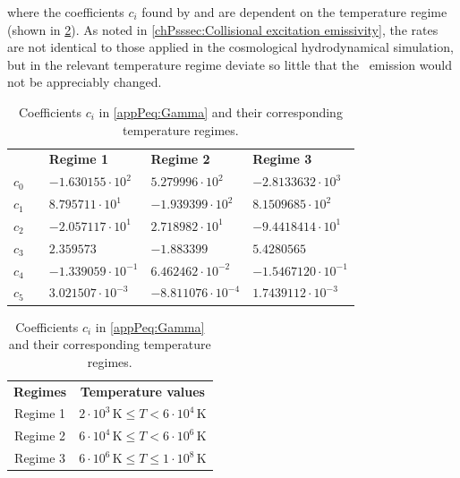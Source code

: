 \noindent where the coefficients $c_i$ found by \citet{1990MNRAS.242..692S} and \citet{1991ApJ...380..302S} are dependent on the temperature regime (shown in \cref{appPtab:Coefficients}). As noted in \cref{chPsssec:Collisional excitation emissivity}, the rates are not identical to those applied in the cosmological hydrodynamical simulation, but in the relevant temperature regime deviate so little that the \lya\ emission would not be appreciably changed.
\begin{table}
    \centering
    \caption[Coefficients $c_i$ in \cref{appPeq:Gamma}]{
        Coefficients $c_i$ in \cref{appPeq:Gamma} and their corresponding temperature regimes.
    }
    \begin{tabular}{c c l l l}
        
        & & \textbf{Regime 1}   & \textbf{Regime 2}     & \textbf{Regime 3} \\
        
        $c_0$ & & $-1.630155 \cdot 10^{2}$      & $5.279996 \cdot 10^{2}$ & $-2.8133632 \cdot 10^{3}$ \\
        
        $c_1$ & & $8.795711 \cdot 10^{1}$       & $-1.939399 \cdot 10^{2}$ & $8.1509685 \cdot 10^{2}$ \\
        
        $c_2$ & & $-2.057117 \cdot 10^{1}$      & $2.718982 \cdot 10^{1}$ & $-9.4418414 \cdot 10^{1}$ \\
        
        $c_3$ & & $2.359573$                            & $-1.883399$                           & $5.4280565$ \\
        
        $c_4$ & & $-1.339059 \cdot 10^{-1}$     & $6.462462 \cdot 10^{-2}$        & $-1.5467120 \cdot 10^{-1}$ \\
        
        $c_5$ & & $3.021507 \cdot 10^{-3}$      & $-8.811076 \cdot 10^{-4}$        & $1.7439112 \cdot 10^{-3}$ \\
    \end{tabular}
    
    \vspace{0.5ex}
    
    \begin{tabular}{c c}
        
        \textbf{Regimes}        & \textbf{Temperature values} \\
        
        Regime 1        & $2 \cdot 10^3 \, \mathrm{K} \leq T < 6 \cdot 10^4 \, \mathrm{K}$ \\
        
        Regime 2        & $6 \cdot 10^4 \, \mathrm{K} \leq T < 6 \cdot 10^6 \, \mathrm{K}$ \\
        
        Regime 3        & $6 \cdot 10^6 \, \mathrm{K} \leq T \leq 1 \cdot 10^8 \, \mathrm{K}$ \\
    \end{tabular}
    \label{appPtab:Coefficients}
\end{table}

